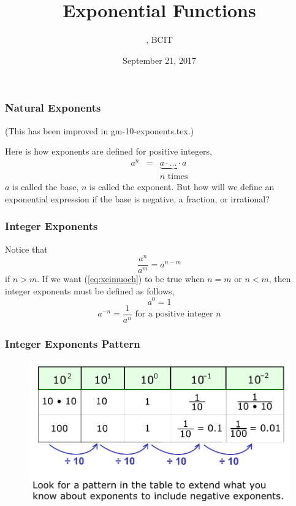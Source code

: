 \documentclass[xcolor=dvipsnames]{beamer}
\title{Exponential Functions}
\subtitle{{\CourseNumber}, BCIT}
\author{\CourseName}
\date{September 21, 2017}
\begin{document}
\begin{frame}
  \titlepage
\end{frame}

\begin{frame}
  \frametitle{Natural Exponents}
(This has been improved in gm-10-exponents.tex.)

Here is how exponents are defined for positive integers,
\begin{equation}
  \label{eq:ogheenoo}
  \begin{array}{rcl}
    a^{n}&=&\underbrace{a\cdot\ldots\cdot{}a} \\
         &&n\mbox{ times}
  \end{array}
\end{equation}
$a$ is called the \alert{base}, $n$ is called the \alert{exponent}.
But how will we define an exponential expression if the base is
negative, a fraction, or irrational?
\end{frame}

\begin{frame}
  \frametitle{Integer Exponents}
Notice that
\begin{equation}
  \label{eq:xeimuoch}
  \frac{a^{n}}{a^{m}}=a^{n-m}
\end{equation}
if $n>m$. If we want (\ref{eq:xeimuoch}) to be true when $n=m$ or
$n<m$, then integer exponents must be defined as follows,
\begin{equation}
  \label{eq:raishaep}
  a^{0}=1
\end{equation}
\begin{equation}
  \label{eq:pahcahka}
  a^{-n}=\frac{1}{a^{n}}\mbox{ for a positive integer }n
\end{equation}
\end{frame}

\begin{frame}
  \frametitle{Integer Exponents Pattern}
  \begin{figure}[h]
    \includegraphics[scale=.4]{./IntegerExponentsPattern.png}
  \end{figure}
\end{frame}
\end{document}
